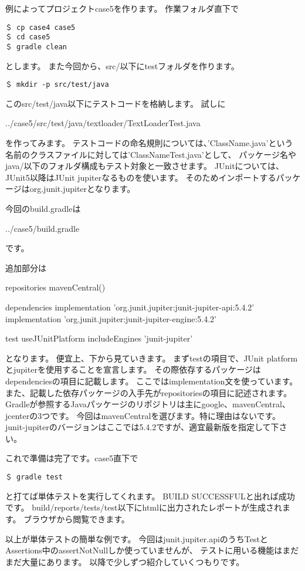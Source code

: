 \documentclass[a4paper,12pt]{article}
\begin{document}
例によってプロジェクトcase5を作ります。
作業フォルダ直下で
\begin{lstlisting}
＄ cp case4 case5
＄ cd case5
＄ gradle clean
\end{lstlisting}
とします。
また今回から、src/以下にtestフォルダを作ります。
\begin{lstlisting}
＄ mkdir -p src/test/java
\end{lstlisting}
このsrc/test/java以下にテストコードを格納します。
試しに
\begin{lstinputlisting}[caption=src/test/java/textloader/TextLoaderTest.java]
	{../case5/src/test/java/textloader/TextLoaderTest.java}
\end{lstinputlisting}
を作ってみます。
テストコードの命名規則については、'ClassName.java'という名前のクラスファイルに対しては'ClassNameTest.java'として、
パッケージ名やjava/以下のフォルダ構成もテスト対象と一致させます。
JUnitについては、JUnit5以降はJUnit jupiterなるものを使います。
そのためインポートするパッケージはorg.junit.jupiterとなります。

\newpage
今回のbuild.gradleは
\begin{lstinputlisting}[caption=case5/build.gradle]
	{../case5/build.gradle}
\end{lstinputlisting}
です。

\newpage
追加部分は
\begin{java}
repositories {
	mavenCentral()
}

dependencies {
	implementation 'org.junit.jupiter:junit-jupiter-api:5.4.2'
	implementation 'org.junit.jupiter:junit-jupiter-engine:5.4.2'
}

test {
	useJUnitPlatform {
		includeEngines 'junit-jupiter'
	}
}
\end{java}
となります。
便宜上、下から見ていきます。
まずtestの項目で、JUnit platformとjupiterを使用することを宣言します。
その際依存するパッケージはdependenciesの項目に記載します。
ここではimplementation文を使っています。
また、記載した依存パッケージの入手先がrepositoriesの項目に記述されます。
Gradleが参照するJavaパッケージのリポジトリは主にgoogle、mavenCentral、jcenterの3つです。
今回はmavenCentralを選びます。特に理由はないです。
junit-jupiterのバージョンはここでは5.4.2ですが、適宜最新版を指定して下さい。

これで準備は完了です。case5直下で
\begin{lstlisting}
＄ gradle test
\end{lstlisting}
と打てば単体テストを実行してくれます。
BUILD SUCCESSFULと出れば成功です。
build/reports/tests/test以下にhtmlに出力されたレポートが生成されます。
ブラウザから閲覧できます。

以上が単体テストの簡単な例です。
今回はjunit.jupiter.apiのうちTestとAssertions中のassertNotNullしか使っていませんが、
テストに用いる機能はまだまだ大量にあります。
以降で少しずつ紹介していくつもりです。


%
%
%
%
\end{document}
